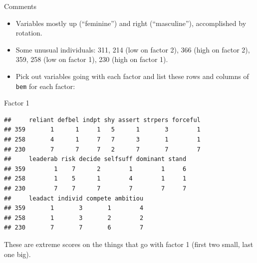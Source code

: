 \begin{frame}[fragile]{Comments}
  
  \begin{itemize}
  \item Variables mostly up (``feminine'') and right (``masculine''),
    accomplished by rotation.
  \item Some unusual individuals: 311, 214 (low on factor 2), 366
    (high on factor 2),
    359, 258
    (low on factor 1), 230 (high on factor 1).
  \item Pick out variables going with each factor and list these rows
    and columns of \texttt{bem} for each factor:
\begin{knitrout}
\color{fgcolor}\begin{kframe}
\begin{alltt}
\hlkwb{=}\hlopt{$}\hlstd{loadings[,}\hlstd{])}\hlopt{>}
\hlkwb{=}\hlstd{(}
\hlkwb{=}\hlopt{$}\hlstd{loadings[,}\hlstd{])}\hlopt{>}
\hlkwb{=}\hlstd{(}
\end{alltt}
\end{kframe}
\end{knitrout}
  \end{itemize}


  
\end{frame}

\begin{frame}[fragile]{Factor 1}

  {\small
\begin{knitrout}
\color{fgcolor}\begin{kframe}
\begin{alltt}
\hlstd{bem[}\hlstd{(}\hlstd{,}\hlstd{,}\hlstd{),big1]}
\end{alltt}
\begin{verbatim}
##     reliant defbel indpt shy assert strpers forceful
## 359       1      1     1   5      1       3        1
## 258       4      1     7   7      3       1        1
## 230       7      7     7   2      7       7        7
##     leaderab risk decide selfsuff dominant stand
## 359        1    7      2        1        1     6
## 258        1    5      1        4        1     1
## 230        7    7      7        7        7     7
##     leadact individ compete ambitiou
## 359       1       3       1        4
## 258       1       3       2        2
## 230       7       7       6        7
\end{verbatim}
\end{kframe}
\end{knitrout}
}

These are extreme scores on the things that go with factor 1 (first
two small, last one big).

\end{frame}

